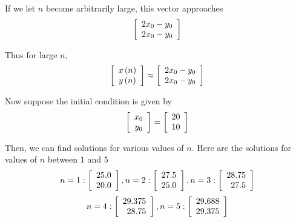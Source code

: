 \begin{solution}
If we let $n$ become arbitrarily large, this vector approaches 
\begin{equation*}
\left[
\begin{array}{c}
2x_{0}-y_{0} \\
2x_{0}-y_{0}
\end{array}
\right] 
\end{equation*}

Thus for large $n,$
\begin{equation*}
\left[
\begin{array}{c}
x\left( n\right) \\
y\left( n\right)
\end{array}
\right] \approx \left[
\begin{array}{c}
2x_{0}-y_{0} \\
2x_{0}-y_{0}
\end{array}
\right]
\end{equation*}

Now suppose the initial condition is given by 
\begin{equation*}
\left[
\begin{array}{c}
x_{0} \\
y_{0}
\end{array}
\right]
=
\left[
\begin{array}{r}
20 \\
10
\end{array}
\right]
\end{equation*}

Then, we can find solutions for various values of $n$. Here are the
solutions for values of $n$ between $1$ and $5$
\begin{equation*}
n=1:
\left[
\begin{array}{r}
25.0 \\
20.0
\end{array}
\right],
n=2: \left[
\begin{array}{r}
27.5 \\
25.0
\end{array}
\right],
n=3: \left[
\begin{array}{r}
28.75 \\
27.5
\end{array}
\right]
\end{equation*}
\begin{equation*}
n=4: \left[
\begin{array}{r}
29.375 \\
28.75
\end{array}
\right],
n=5: \left[
\begin{array}{r}
29.688 \\
29.375
\end{array}
\right]
\end{equation*}


\end{solution}
